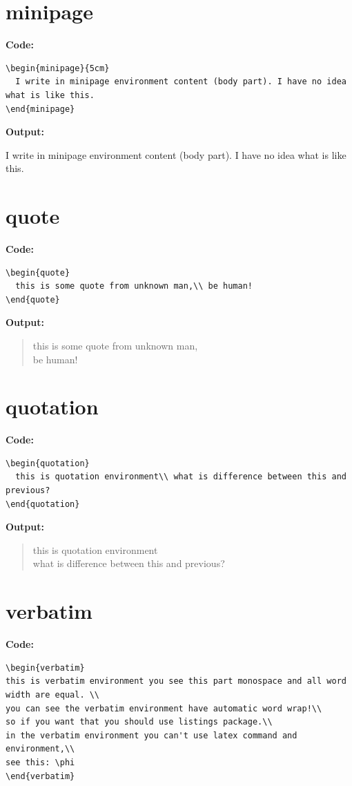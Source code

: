 \documentclass{book}
\newcommand{\myc}{\noindent\textbf{{\color{blue} Code}:}}
\newcommand{\myo}{\noindent\textbf{{\color{blue} Output}:\\}}
\begin{document}
\section{minipage}
\myc
\begin{lstlisting}
\begin{minipage}{5cm}
  I write in minipage environment content (body part). I have no idea what is like this.
\end{minipage}
\end{lstlisting}

\myo
\begin{minipage}{5cm}
  I write in minipage environment content (body part). I have no idea what is like this.
\end{minipage}

\section{quote}
\myc
\begin{lstlisting}
\begin{quote}
  this is some quote from unknown man,\\ be human!
\end{quote}
\end{lstlisting}

\myo
\begin{quote}
  this is some quote from unknown man,\\ be human!
\end{quote}

\section{quotation}
\myc
\begin{lstlisting}
\begin{quotation}
  this is quotation environment\\ what is difference between this and previous?
\end{quotation}
\end{lstlisting}

\myo
\begin{quotation}
  this is quotation environment\\ what is difference between this and previous?
\end{quotation}

\section{verbatim}
\myc
\begin{lstlisting}
\begin{verbatim}
this is verbatim environment you see this part monospace and all word width are equal. \\
you can see the verbatim environment have automatic word wrap!\\
so if you want that you should use listings package.\\
in the verbatim environment you can't use latex command and environment,\\
see this: \phi
\end{verbatim}
\end{lstlisting}
\end{document}
